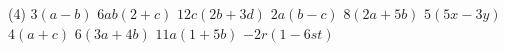 %
%
    \begin{tasks}(4)
        \task $3 (a - b)$
        \task $6ab (2 + c)$
        \task $12c (2 b + 3 d)$
        \task $2a (b - c)$
        \task $8 (2 a + 5 b)$
        \task $5 (5 x - 3 y)$
        \task $4 (a + c)$
        \task $6 (3 a + 4 b)$
        \task $11a ( 1+ 5 b)$
        \task $- 2r (1 - 6 st)$
    \end{tasks}
